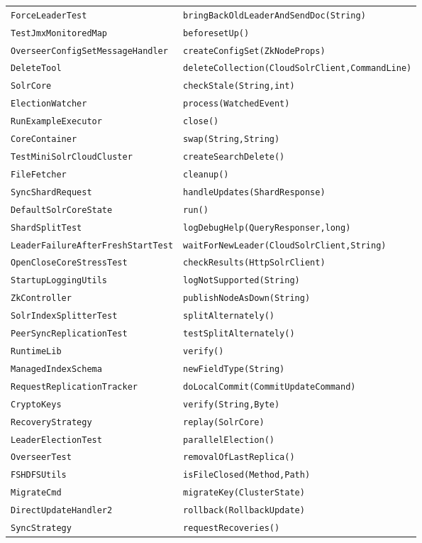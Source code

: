 \begin{center}
\begin{longtable}{ll}
\lstinline/ForceLeaderTest/&{\lstinline/bringBackOldLeaderAndSendDoc(String)/}\\
\lstinline/TestJmxMonitoredMap/&{\lstinline/beforesetUp()/}\\
\lstinline/OverseerConfigSetMessageHandler/&{\lstinline/createConfigSet(ZkNodeProps)/}\\
\lstinline/DeleteTool/&{\lstinline/deleteCollection(CloudSolrClient,CommandLine)/}\\
\lstinline/SolrCore/&{\lstinline/checkStale(String,int)/}\\
\lstinline/ElectionWatcher/&{\lstinline/process(WatchedEvent)/}\\
\lstinline/RunExampleExecutor/&{\lstinline/close()/}\\
\lstinline/CoreContainer/&{\lstinline/swap(String,String)/}\\
\lstinline/TestMiniSolrCloudCluster/&{\lstinline/createSearchDelete()/}\\
\lstinline/FileFetcher/&{\lstinline/cleanup()/}\\
\lstinline/SyncShardRequest/&{\lstinline/handleUpdates(ShardResponse)/}\\
\lstinline/DefaultSolrCoreState/&{\lstinline/run()/}\\
\lstinline/ShardSplitTest/&{\lstinline/logDebugHelp(QueryResponser,long)/}\\
\lstinline/LeaderFailureAfterFreshStartTest/&{\lstinline/waitForNewLeader(CloudSolrClient,String)/}\\
\lstinline/OpenCloseCoreStressTest/&{\lstinline/checkResults(HttpSolrClient)/}\\
\lstinline/StartupLoggingUtils/&{\lstinline/logNotSupported(String)/}\\
\lstinline/ZkController/&{\lstinline/publishNodeAsDown(String)/}\\
\lstinline/SolrIndexSplitterTest/&{\lstinline/splitAlternately()/}\\
\lstinline/PeerSyncReplicationTest/&{\lstinline/testSplitAlternately()/}\\
\lstinline/RuntimeLib/&{\lstinline/verify()/}\\
\lstinline/ManagedIndexSchema/&{\lstinline/newFieldType(String)/}\\
\lstinline/RequestReplicationTracker/&{\lstinline/doLocalCommit(CommitUpdateCommand)/}\\
\lstinline/CryptoKeys/&{\lstinline/verify(String,Byte)/}\\
\lstinline/RecoveryStrategy/&{\lstinline/replay(SolrCore)/}\\
\lstinline/LeaderElectionTest/&{\lstinline/parallelElection()/}\\
\lstinline/OverseerTest/&{\lstinline/removalOfLastReplica()/}\\
\lstinline/FSHDFSUtils/&{\lstinline/isFileClosed(Method,Path)/}\\
\lstinline/MigrateCmd/&{\lstinline/migrateKey(ClusterState)/}\\
\lstinline/DirectUpdateHandler2/&{\lstinline/rollback(RollbackUpdate)/}\\
\lstinline/SyncStrategy/&{\lstinline/requestRecoveries()/}\\


\end{longtable}
\end{center}
